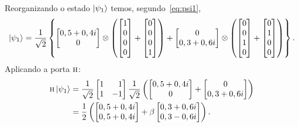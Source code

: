 Reorganizando o estado $\ket{\psi_1}$ temos, segundo~\eqref{eq:psi1},
\begin{equation}
  \ket{\psi_1} = \frac{1}{\sqrt{2}} \left\{ \begin{bmatrix} {0,5+0,4i} \\ 0 \end{bmatrix} \otimes
    \left(
      \begin{bmatrix} 1 \\ 0 \\ 0 \\ 0 \end{bmatrix} +
      \begin{bmatrix} 0 \\ 0 \\ 0 \\ 1 \end{bmatrix}
    \right) +
    \begin{bmatrix} 0 \\ {0,3+0,6i} \end{bmatrix} \otimes
    \left(
      \begin{bmatrix} 0 \\ 0 \\ 1 \\ 0 \end{bmatrix} +
      \begin{bmatrix} 0 \\ 1 \\ 0 \\ 0 \end{bmatrix}
    \right) \right\}.
\end{equation}
Aplicando a porta \(\operatorname{\textsc{h}}\):
\begin{equation}
  \label{eq:1}
  \begin{aligned}
    \HAD \ket{\psi_{1}} &= \frac{1}{\sqrt{2}}
                          \begin{bmatrix*}[r] 1 & 1 \\ 1 & -1 \end{bmatrix*}
                          \frac{1}{\sqrt{2}}\left(
                          \begin{bmatrix} {\norma} \\ 0 \end{bmatrix} +
                          \begin{bmatrix} 0 \\ {\normb} \end{bmatrix} \right)\\
                        &= \frac{1}{2} \left(
                          \begin{bmatrix} {\norma} \\ {\norma} \end{bmatrix} +
                          \beta \begin{bmatrix*}[r] {\normb} \\ {0,3-0,6i} \end{bmatrix*} \right).
  \end{aligned}
\end{equation}
